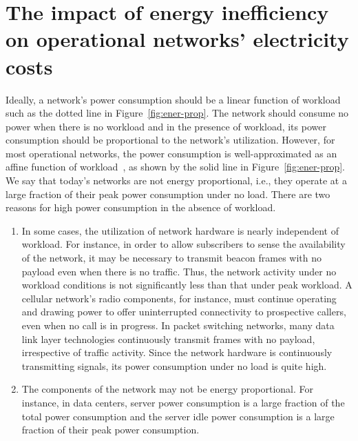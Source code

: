 \section{The impact of energy inefficiency on operational networks' electricity costs} 

Ideally, a network's power consumption should be a linear function of workload such as the dotted line in Figure~\ref{fig:ener-prop}. The network should consume no power when there is no workload and in the presence of workload, its power consumption should be proportional to the network's utilization. However, for most operational networks, the power consumption is well-approximated as an affine function of workload~\cite{Peng:2011:TPS:2030613.2030628,Fan:power:ICSA:2007}, as shown by the solid line in Figure~\ref{fig:ener-prop}. We say that today's networks are not energy proportional, i.e., they operate at a large fraction of their peak power consumption under no load. There are two reasons for high power consumption in the absence of workload. 
\begin{enumerate}
\item In some cases, the utilization of network hardware is nearly independent of workload. For instance, in order to allow subscribers to sense the availability of the network, it may be necessary to transmit beacon frames with no payload even when there is no traffic. Thus, the network activity under no workload conditions is not significantly less than that under peak workload. A cellular network's radio components, for instance, must continue operating and drawing power to offer uninterrupted connectivity to prospective callers, even when no call is in progress. In packet switching networks, many data link layer technologies continuously transmit frames with no payload, irrespective of traffic activity. Since the network hardware is continuously transmitting signals, its power consumption under no load is quite high.
\item The components of the network may not be energy proportional. For instance, in data centers, server power consumption is a large fraction of the total power consumption and the server idle power consumption is a large fraction of their peak power consumption. 
\end{enumerate}


